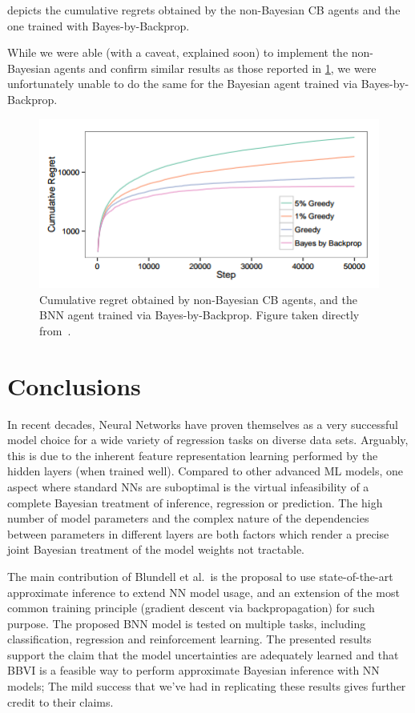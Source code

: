 \documentclass[11pt]{article}
\begin{document}
 depicts the cumulative regrets obtained by the
non-Bayesian CB agents and the one trained with Bayes-by-Backprop.  

While we were able (with a caveat, explained soon) to implement the
non-Bayesian agents and confirm similar results as those reported in
\cref{fig:cb_cumregret}, we were unfortunately unable to do the same for the
Bayesian agent trained via Bayes-by-Backprop.



\begin{figure}
  \centering\includegraphics[width=.5\textwidth]{figures/cb_cumregret.png}
  \caption{Cumulative regret obtained by non-Bayesian CB agents, and the BNN
  agent trained via Bayes-by-Backprop.  Figure taken directly
  from~\cite{blundell}.}\label{fig:cb_cumregret}
\end{figure}


\section{Conclusions}

In recent decades, Neural Networks have proven themselves as a very successful
model choice for a wide variety of regression tasks on diverse data sets.
Arguably, this is due to the inherent feature representation learning performed
by the hidden layers (when trained well).  Compared to other advanced ML models,
one aspect where standard NNs are suboptimal is the virtual infeasibility of
a complete Bayesian treatment of inference, regression or prediction.  The high
number of model parameters and the complex nature of the dependencies between
parameters in different layers are both factors which render a precise joint
Bayesian treatment of the model weights not tractable.

The main contribution of Blundell et al.\ is the proposal to use
state-of-the-art approximate inference to extend NN model usage, and an
extension of the most common training principle (gradient descent via
backpropagation) for such purpose.  The proposed BNN model is tested on
multiple tasks, including classification, regression and reinforcement
learning.  The presented results support the claim that the model uncertainties
are adequately learned and that BBVI is a feasible way to perform approximate
Bayesian inference with NN models; The mild success that we've had in
replicating these results gives further credit to their claims.
\end{document}
